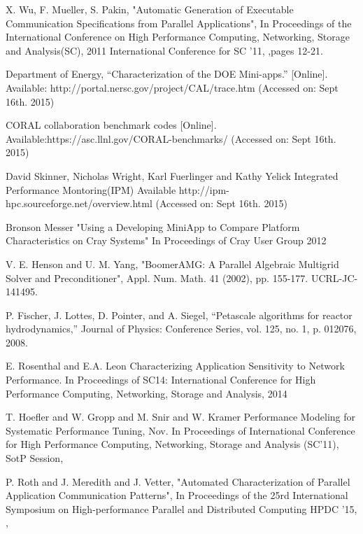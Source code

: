 \documentclass[conference]{IEEEtran}
\begin{document}
\begin{thebibliography}{10}
X. Wu, F. Mueller, S. Pakin, 
\newblock "Automatic Generation of Executable Communication Specifications from Parallel Applications", 
\newblock In {Proceedings of the International Conference on High Performance Computing, Networking, Storage and Analysis(SC), 2011 International Conference for}
\newblock SC '11,
,pages 12-21.

Department of Energy, “Characterization of the DOE Mini-apps.” [Online].
\newblock Available: http://portal.nersc.gov/project/CAL/trace.htm
\newblock (Accessed on: Sept 16th. 2015)


CORAL collaboration benchmark codes [Online].
\newblock Available:https://asc.llnl.gov/CORAL-benchmarks/
\newblock (Accessed on: Sept 16th. 2015)

David Skinner, Nicholas Wright, Karl Fuerlinger and Kathy Yelick
\newblock Integrated Performance Montoring(IPM)
\newblock Available http://ipm-hpc.sourceforge.net/overview.html
\newblock (Accessed on: Sept 16th. 2015)


Bronson Messer
\newblock "Using a Developing MiniApp to Compare Platform Characteristics on Cray Systems"
\newblock In Proceedings of Cray User Group 2012

V. E. Henson and U. M. Yang, 
\newblock "BoomerAMG: A Parallel Algebraic Multigrid Solver and Preconditioner",
\newblock Appl. Num. Math. 41 (2002), pp. 155-177. UCRL-JC-141495.

P. Fischer, J. Lottes, D. Pointer, and A. Siegel, 
\newblock “Petascale algorithms for reactor hydrodynamics,”
\newblock Journal of Physics: Conference Series, vol. 125, no. 1, p. 012076, 2008.


E. Rosenthal and E.A. Leon
\newblock Characterizing Application Sensitivity to Network Performance.
\newblock  In {Proceedings of SC14: International
Conference for High Performance Computing, Networking, Storage and Analysis},
2014

T. Hoefler and W. Gropp and M. Snir and W. Kramer
\newblock Performance Modeling for Systematic Performance Tuning,
\newblock Nov.
\newblock In {Proceedings of International Conference for High Performance Computing, Networking, Storage and Analysis (SC'11), SotP Session,
}

P. Roth and J. Meredith and J. Vetter,
\newblock "Automated Characterization of Parallel Application Communication Patterns",
In Proceedings of the 25rd International Symposium on High-performance Parallel and Distributed Computing
\newblock HPDC '15,
,



\end{thebibliography}
\end{document}
